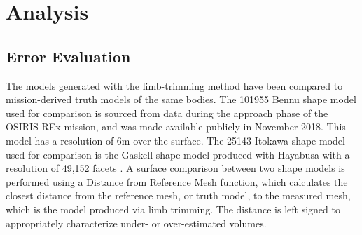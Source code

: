 \section{Analysis}
\subsection{Error Evaluation}
The models generated with the limb-trimming method have been compared to mission-derived truth models of the same bodies. The 101955 Bennu shape model used for comparison is sourced from data during the approach phase of the OSIRIS-REx mission, and was made available publicly in November 2018{}. This model has a resolution of 6m over the surface. The 25143 Itokawa shape model used for comparison is the Gaskell shape model produced with Hayabusa with a resolution of 49,152 facets \cite{Gaskell2004}. A surface comparison between two shape models is performed using a Distance from Reference Mesh function, which calculates the closest distance from the reference mesh, or truth model, to the measured mesh, which is the model produced via limb trimming. The distance is left signed to appropriately characterize under- or over-estimated volumes. 


          
          
          
